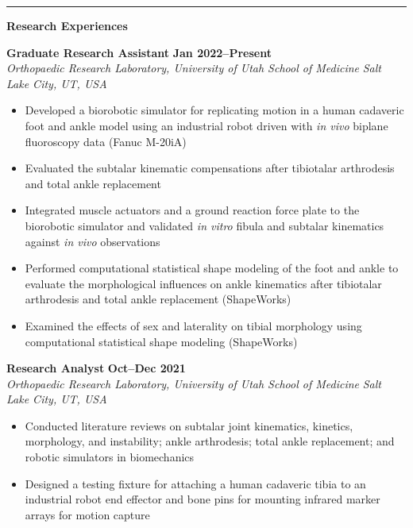 \documentclass[10pt]{letter}
\begin{document}
\par\noindent\rule{\textwidth}{0.5pt}


\begin{center}
\textbf{\large Research Experiences} \\
\end{center}
\vspace{-5pt}
\textbf{Graduate Research Assistant}
\hfill
\textbf{Jan 2022--Present} \\
\textit{Orthopaedic Research Laboratory, University of Utah School of Medicine}
\hfill
\textit{Salt Lake City, UT, USA} \\
\vspace{2pt}
{\small
\begin{itemize}
    \item Developed a biorobotic simulator for replicating motion in a human cadaveric foot and ankle model using an industrial robot driven with \textit{in vivo} biplane fluoroscopy data (Fanuc M-20iA)
    \item Evaluated the subtalar kinematic compensations after tibiotalar arthrodesis and total ankle replacement
    \item Integrated muscle actuators and a ground reaction force plate to the biorobotic simulator and validated \textit{in vitro} fibula and subtalar kinematics against \textit{in vivo} observations
    \item Performed computational statistical shape modeling of the foot and ankle to evaluate the morphological influences on ankle kinematics after tibiotalar arthrodesis and total ankle replacement (ShapeWorks)
    \item Examined the effects of sex and laterality on tibial morphology using computational statistical shape modeling (ShapeWorks)
\end{itemize}}
\vspace{10pt}

\textbf{Research Analyst}
\hfill
\textbf{Oct--Dec 2021} \\
\textit{Orthopaedic Research Laboratory, University of Utah School of Medicine}
\hfill
\textit{Salt Lake City, UT, USA} \\
\vspace{2pt}
{\small
\begin{itemize}
    \item Conducted literature reviews on subtalar joint kinematics, kinetics, morphology, and instability; ankle arthrodesis; total ankle replacement; and robotic simulators in biomechanics
    \item Designed a testing fixture for attaching a human cadaveric tibia to an industrial robot end effector and bone pins for mounting infrared marker arrays for motion capture
\end{itemize}}
\vspace{10pt}
\end{document}
